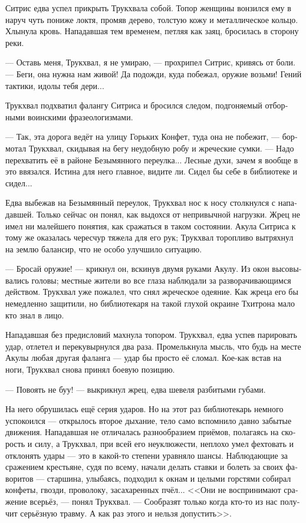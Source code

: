 \documentclass[a4paper,12pt,fleqn]{book}\usepackage{polyglossia}\setdefaultlanguage[babelshorthands=true]{russian}\setotherlanguage{english}\defaultfontfeatures{Ligatures=TeX,Mapping=tex-text}\usepackage{xcolor}\newcommand{\ml}[3]{#2}
\begin{document}
Ситрис едва успел прикрыть Трукхвала собой.
Топор женщины вонзился ему в наруч чуть пониже локтя, промяв дерево, толстую кожу и металлическое кольцо.
Хлынула кровь.
Нападавшая тем временем, петляя как заяц, бросилась в сторону реки.

--- Оставь меня, Трукхвал, я не умираю, --- прохрипел Ситрис, кривясь от боли.
--- Беги, она нужна нам живой!
Да подожди, куда побежал, оружие возьми!
Гений тактики, идолы тебя дери...

Трукхвал подхватил фалангу Ситриса и бросился следом, подгоняемый отборными воинскими фразеологизмами.

--- Так, эта дорога ведёт на улицу Горьких Конфет, туда она не побежит, --- бормотал Трукхвал, скидывая на бегу неудобную робу и жреческие сумки.
--- Надо перехватить её в районе Безымянного переулка...
Лесные духи, зачем я вообще в это ввязался.
Истина для него главное, видите ли.
Сидел бы себе в библиотеке и сидел...

Едва выбежав на Безымянный переулок, Трукхвал нос к носу столкнулся с нападавшей.
Только сейчас он понял, как выдохся от непривычной нагрузки.
Жрец не имел ни малейшего понятия, как сражаться в таком состоянии.
Акула Ситриса к тому же оказалась чересчур тяжела для его рук;
Трукхвал торопливо вытряхнул на землю балансир, что не особо улучшило ситуацию.

--- Бросай оружие! --- крикнул он, вскинув двумя руками Акулу.
Из окон высовывались головы;
местные жители во все глаза наблюдали за разворачивающимся действом.
Трукхвал уже пожалел, что снял жреческое одеяние.
Как жреца его бы немедленно защитили, но библиотекаря на такой глухой окраине Тхитрона мало кто знал в лицо.

Нападавшая без предисловий махнула топором.
Трукхвал, едва успев парировать удар, отлетел и перекувырнулся два раза.
Промелькнула мысль, что будь на месте Акулы любая другая фаланга --- удар бы просто её сломал.
Кое-как встав на ноги, Трукхвал снова принял боевую позицию.

--- Повоять не буу! --- выкрикнул жрец, едва шевеля разбитыми губами.

На него обрушилась ещё серия ударов.
Но на этот раз библиотекарь немного успокоился --- открылось второе дыхание, тело само вспомнило давно забытые движения.
Нападавшая не отличалась разнообразием приёмов, полагаясь на скорость и силу, а Трукхвал, при всей его неуклюжести, неплохо умел фехтовать и отклонять удары --- это в какой-то степени уравняло шансы.
Наблюдающие за сражением крестьяне, судя по всему, начали делать ставки и болеть за своих фаворитов --- старшина, улыбаясь, подходил к окнам и целыми горстями собирал конфеты, гвозди, проволоку, засахаренных пчёл...
<<Они не воспринимают сражение всерьёз, --- понял Трукхвал.
--- Сообразят только когда кто-то из нас получит серьёзную травму.
А как раз этого и нельзя допустить>>.
\end{document}

